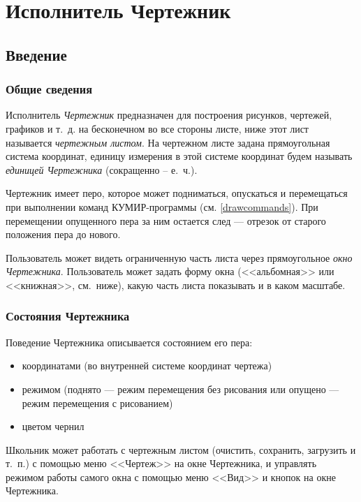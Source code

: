 \chapter{Исполнитель Чертежник}

\section{Введение}

\subsection{Общие сведения}

Исполнитель \emph{Чертежник} предназначен для построения рисунков, чертежей, графиков и т.~д. на бесконечном во все стороны листе, ниже этот лист называется  \emph{чертежным \mbox{листом}}. На чертежном листе  задана прямоугольная система координат, единицу измерения в этой системе координат будем называть \emph{единицей Чертежника} (сокращенно – е.~ч.).

Чертежник имеет перо, которое может подниматься, опускаться и перемещаться при выполнении команд КУМИР-программы (см. \ref{drawcommands}). При перемещении опущенного пера за ним остается след --- отрезок от старого положения пера до нового.

	Пользователь может видеть ограниченную часть листа через прямоугольное \emph{окно \mbox{Чертежника}}. Пользователь может задать форму окна (<<альбомная>> или <<книжная>>, см.~ниже), какую часть листа показывать и в каком масштабе.

\subsection{Состояния Чертежника}
\label{drawstates}

Поведение Чертежника описывается состоянием его пера:
\begin{itemize}
\item координатами (во внутренней системе координат чертежа)
\item режимом (поднято --- режим перемещения без рисования или опущено --- режим перемещения с рисованием)
\item цветом чернил
\end{itemize}
Школьник может работать с чертежным  листом (очистить, сохранить, загрузить и т.~п.) с помощью меню <<Чертеж>> на окне Чертежника, и управлять режимом работы самого окна с помощью меню <<Вид>> и кнопок на окне Чертежника. 

